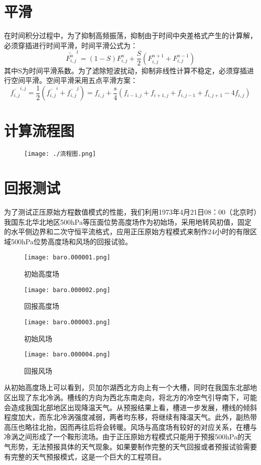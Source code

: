 \documentclass[a4paper,12pt]{article}
\begin{document}
\section{平滑}
在时间积分过程中，为了抑制高频振荡，抑制由于时间中央差格式产生的计算解，必须穿插进行时间平滑，时间平滑公式为：
\begin{equation}
\widetilde{F_{i,j}^n}^t=(1-S)F_{i,j}^n+\dfrac{S}{2}(F_{i,j}^{n+1}+F_{i,j}^{n-1})
\end{equation}
其中S为时间平滑系数。为了滤除短波扰动，抑制非线性计算不稳定，必须穿插进行空间平滑。空间平滑采用五点平滑方案：
\begin{equation}
\bar{f_{i,j}}^{i,j}=\dfrac{1}{2}(\bar{f_{i,j}}^i +\bar{f_{i,j}}^j)=f_{i,j}+\dfrac{s}{4}(f_{i-1,j}+f_{i+1,j}+f_{i,j-1}+f_{i,j+1}-4f_{i,j})
\end{equation}

\section{计算流程图}
\begin{figure}[H]
\centering
\texttt{[image: ./流程图.png]}
\end{figure}

\section{回报测试}
为了测试正压原始方程数值模式的性能，我们利用1973年4月21日08：00（北京时）我国东北华北地区500hPa等压面位势高度场作为初始场，采用地转风初值，固定的水平侧边界和二次守恒平流格式，应用正压原始方程模式来制作24小时的有限区域500hPa位势高度场和风场的回报试验。
\begin{figure}[H]  
\begin{minipage}[t]{0.5\linewidth}  
\centering  
\texttt{[image: baro.000001.png]}  
\caption{初始高度场}  
\label{fig:side:a}  
\end{minipage}
\begin{minipage}[t]{0.5\linewidth}  
\centering  
\texttt{[image: baro.000002.png]}  
\caption{回报高度场}  
\label{fig:side:b}  
\end{minipage}  
\begin{minipage}[t]{0.5\linewidth}  
\centering  
\texttt{[image: baro.000003.png]}  
\caption{初始风场}  
\label{fig:side:c}  
\end{minipage}  
\begin{minipage}[t]{0.5\linewidth}  
\centering  
\texttt{[image: baro.000004.png]}  
\caption{回报风场}  
\label{fig:side:d}  
\end{minipage}  
\end{figure}  
从初始高度场上可以看到，贝加尔湖西北方向上有一个大槽，同时在我国东北部地区出现了东北冷涡。槽线的方向为西北东南走向，将北方的冷空气引导南下，可能会造成我国北部地区出现降温天气。从预报结果上看，槽进一步发展，槽线的倾斜程度加大，而东北冷涡强度减弱，两者均东移，将继续有降温天气。此外，副热带高压也略往北抬，因而再往后将会转暖。风场与高度场有较好的对应关系，在槽与冷涡之间形成了一个鞍形流场。由于正压原始方程模式只能用于预报500hPa的天气形势，无法预报具体的天气现象。如果要制作完整的天气回报或者预报试验需要有完整的天气预报模式，这是一个巨大的工程项目。
\end{document}
